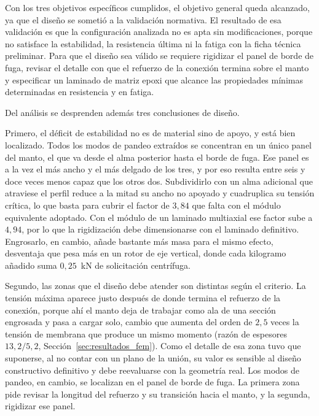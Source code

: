 Con los tres objetivos específicos cumplidos, el objetivo general queda alcanzado, ya que el diseño se sometió a la validación normativa. El resultado de esa validación es que la configuración analizada no es apta sin modificaciones, porque no satisface la estabilidad, la resistencia última ni la fatiga con la ficha técnica preliminar. Para que el diseño sea válido se requiere rigidizar el panel de borde de fuga, revisar el detalle con que el refuerzo de la conexión termina sobre el manto y especificar un laminado de matriz epoxi que alcance las propiedades mínimas determinadas en resistencia y en fatiga.

Del análisis se desprenden además tres conclusiones de diseño.

Primero, el déficit de estabilidad no es de material sino de apoyo, y está bien localizado. Todos los modos de pandeo extraídos se concentran en un único panel del manto, el que va desde el alma posterior hasta el borde de fuga. Ese panel es a la vez el más ancho y el más delgado de los tres, y por eso resulta entre seis y doce veces menos capaz que los otros dos. Subdividirlo con un alma adicional que atraviese el perfil reduce a la mitad su ancho no apoyado y cuadruplica su tensión crítica, lo que basta para cubrir el factor de $3{,}84$ que falta con el módulo equivalente adoptado. Con el módulo de un laminado multiaxial ese factor sube a $4{,}94$, por lo que la rigidización debe dimensionarse con el laminado definitivo. Engrosarlo, en cambio, añade bastante más masa para el mismo efecto, desventaja que pesa más en un rotor de eje vertical, donde cada kilogramo añadido suma $0{,}25$~kN de solicitación centrífuga.

Segundo, las zonas que el diseño debe atender son distintas según el criterio. La tensión máxima aparece justo después de donde termina el refuerzo de la conexión, porque ahí el manto deja de trabajar como ala de una sección engrosada y pasa a cargar solo, cambio que aumenta del orden de $2{,}5$ veces la tensión de membrana que produce un mismo momento (razón de espesores $13{,}2/5{,}2$, Sección~\ref{sec:resultados_fem}). Como el detalle de esa zona tuvo que suponerse, al no contar con un plano de la unión, su valor es sensible al diseño constructivo definitivo y debe reevaluarse con la geometría real. Los modos de pandeo, en cambio, se localizan en el panel de borde de fuga. La primera zona pide revisar la longitud del refuerzo y su transición hacia el manto, y la segunda, rigidizar ese panel.

